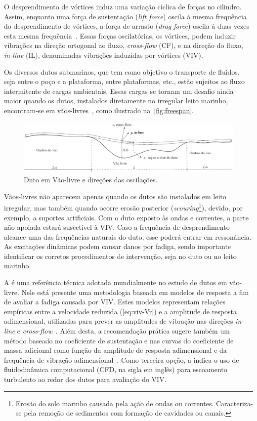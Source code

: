 O desprendimento de vórtices induz uma variação cíclica de forças no cilindro.
Assim, enquanto uma força de sustentação (\textit{lift force}) oscila à mesma frequência do desprendimento de vórtices, a força de arrasto (\textit{drag force}) oscila à duas vezes esta mesma frequência~\cite{Sumer1995}.
Essas forças oscilatórias, os vórtices, podem induzir vibrações na direção ortogonal ao fluxo, \textit{cross-flow} (CF), e na direção do fluxo, \textit{in-line} (IL), denominadas vibrações induzidas por vórtices (VIV).

Os diversos dutos submarinos, que tem como objetivo o transporte de fluidos, seja entre o poço e a plataforma, entre plataformas, etc., estão sujeitos ao fluxo intermitente de cargas ambientais.
Essas cargas se tornam um desafio ainda maior quando os dutos, instalados diretamente no irregular leito marinho, encontram-se em vãos-livres~\cite{Fyrileiv1998}, como ilustrado na~\autoref{fig:freespan}.

\begin{figure}[!ht]
	\centering
    \caption{Duto em Vão-livre e direções das oscilações.}\label{fig:freespan}
	\includegraphics[width=1\textwidth]{imagens/freespan}
\end{figure}

Vãos-livres não aparecem apenas quando os dutos são instalados em leito irregular, mas também quando ocorre erosão posterior (\textit{scouring}\footnote{Erosão do solo marinho causada pela ação de ondas ou correntes. Caracteriza-se pela remoção de sedimentos com formação de cavidades ou canais.}), devido, por exemplo, a suportes artificiais.
Com o duto exposto às ondas e correntes, a parte não apoiada estará suscetível à VIV.\@
Caso a frequência de desprendimento alcance uma das frequências naturais do duto, esse poderá entrar em ressonância.
As excitações dinâmicas podem causar danos por fadiga, sendo importante identificar os corretos procedimentos de intervenção, seja no duto ou no leito marinho.

A  é uma referência técnica adotada mundialmente no estudo de dutos em vão-livre.
Nele está presente uma metodologia baseada em modelos de resposta a fim de avaliar a fadiga causada por VIV\@.
Estes modelos representam relações empíricas entre a velocidade reduzida (\autoref{eq:viv-Vr}) e a amplitude de resposta adimensional, utilizadas para prever as amplitudes de vibração nas direções \textit{in-line} e \textit{cross-flow}~\cite{Mork2003,DNV2017}.
Além desta, a recomendação prática sugere também um método baseado no coeficiente de sustentação e nas curvas do coeficiente de massa adicional como função da amplitude de resposta adimensional e da frequência de vibração adimensional~\cite{DNV2017}.
Como terceira opção, a  indica o uso de fluidodinâmica computacional (CFD, na sigla em inglês) para escoamento turbulento ao redor dos dutos para avaliação do VIV\@.

